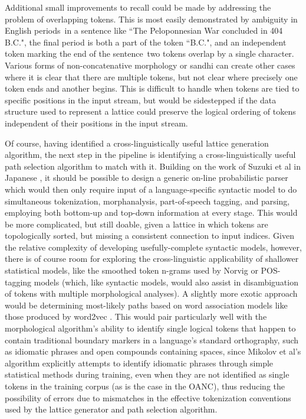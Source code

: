 Additional small improvements to recall could be made by addressing the problem of overlapping tokens. This is most easily demonstrated by ambiguity in English periods\textemdash~in a sentence like ``The Peloponnesian War concluded in 404 B.C.", the final period is both a part of the token ``B.C.", and an independent token marking the end of the sentence\textemdash~two tokens overlap by a single character. Various forms of non-concatenative morphology or sandhi can create other cases where it is clear that there are multiple tokens, but not clear where precisely one token ends and another begins. This is difficult to handle when tokens are tied to specific positions in the input stream, but would be sidestepped if the data structure used to represent a lattice could preserve the logical ordering of tokens independent of their positions in the input stream.

Of course, having identified a cross-linguistically useful lattice generation algorithm, the next step in the pipeline is identifying a cross-linguistically useful path selection algorithm to match with it. Building on the work of Suzuki et al in Japanese \cite{suzuki00}, it should be possible to design a generic on-line probabilistic parser which would then only require input of a language-specific syntactic model to do simultaneous tokenization, morphanalysis, part-of-speech tagging, and parsing, employing both bottom-up and top-down information at every stage. This would be more complicated, but still doable, given a lattice in which tokens are topologically sorted, but missing a consistent connection to input indices. Given the relative complexity of developing usefully-complete syntactic models, however, there is of course room for exploring the cross-linguistic applicability of shallower statistical models, like the smoothed token n-grams used by Norvig \cite{norvig14} or POS-tagging models (which, like syntactic models, would also assist in disambiguation of tokens with multiple morphological analyses). A slightly more exotic approach would be determining most-likely paths based on word association models like those produced by word2vec \cite{mikolov13}. This would pair particularly well with the morphological algorithm's ability to identify single logical tokens that happen to contain traditional boundary markers in a language's standard orthography, such as idiomatic phrases and open compounds containing spaces, since Mikolov et al's algorithm explicitly attempts to identify idiomatic phrases through simple statistical methods during training, even when they are not identified as single tokens in the training corpus (as is the case in the OANC), thus reducing the possibility of errors due to mismatches in the effective tokenization conventions used by the lattice generator and path selection algorithm.